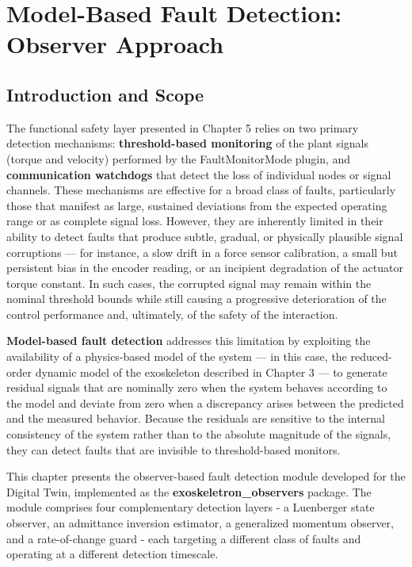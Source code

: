 \chapter{Model-Based Fault Detection: Observer Approach}
\section{Introduction and Scope}
The functional safety layer presented in Chapter 5 relies on two primary detection mechanisms: \textbf{threshold-based monitoring} of the plant signals (torque and velocity) performed by the FaultMonitorMode plugin, and \textbf{communication watchdogs} that detect the loss of individual nodes or signal channels. These mechanisms are effective for a broad class of faults, particularly those that manifest as large, sustained deviations from the expected operating range or as complete signal loss. However, they are inherently limited in their ability to detect faults that produce subtle, gradual, or physically plausible signal corruptions — for instance, a slow drift in a force sensor calibration, a small but persistent bias in the encoder reading, or an incipient degradation of the actuator torque constant. In such cases, the corrupted signal may remain within the nominal threshold bounds while still causing a progressive deterioration of the control performance and, ultimately, of the safety of the interaction.

\textbf{Model-based fault detection} addresses this limitation by exploiting the availability of a physics-based model of the system — in this case, the reduced-order dynamic model of the exoskeleton described in Chapter 3 — to generate residual signals that are nominally zero when the system behaves according to the model and deviate from zero when a discrepancy arises between the predicted and the measured behavior. Because the residuals are sensitive to the internal consistency of the system rather than to the absolute magnitude of the signals, they can detect faults that are invisible to threshold-based monitors.

This chapter presents the observer-based fault detection module developed for the Digital Twin, implemented as the \textbf{exoskeletron\_observers} package. The module comprises four complementary detection layers - a Luenberger state observer, an admittance inversion estimator, a generalized momentum observer, and a rate-of-change guard - each targeting a different class of faults and operating at a different detection timescale.

